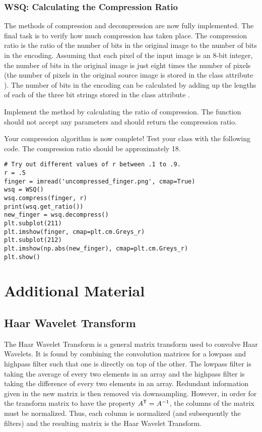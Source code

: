 \subsubsection*{WSQ: Calculating the Compression Ratio}
The methods of compression and decompression are now fully implemented. The final task is to verify how much compression has taken place.
The compression ratio is the ratio of the number of bits in the original image to the number of bits in the encoding.
Assuming that each pixel of the input image is an 8-bit integer, the number of bits in the original image is just eight times the number of pixels
(the number of pixels in the original source image is stored in the class attribute ).
The number of bits in the encoding can be calculated by adding up the lengths of each of the three bit strings stored in the class attribute .
\begin{problem}
Implement the method  by calculating the ratio of compression.
The function should not accept any parameters and should return the compression ratio.

Your compression algorithm is now complete! Test your class with the following code.
The compression ratio should be approximately 18.
\begin{lstlisting}
# Try out different values of r between .1 to .9.
r = .5
finger = imread('uncompressed_finger.png', cmap=True)
wsq = WSQ()
wsq.compress(finger, r)
print(wsq.get_ratio())
new_finger = wsq.decompress()
plt.subplot(211)
plt.imshow(finger, cmap=plt.cm.Greys_r)
plt.subplot(212)
plt.imshow(np.abs(new_finger), cmap=plt.cm.Greys_r)
plt.show()
\end{lstlisting}
\end{problem}
\newpage

\section*{Additional Material} %
\subsection*{Haar Wavelet Transform}
The Haar Wavelet Transform is a general matrix transform used to convolve Haar Wavelets.
It is found by combining the convolution matrices for a lowpass and highpass filter such that one is directly on top of the other.
The lowpass filter is taking the average of every two elements in an array and the highpass filter is taking the difference of every two elements in an array.
Redundant information given in the new matrix is then removed via downsampling.
However, in order for the transform matrix to have the property $A^{\mathsf T} =A^{-1}$, the columns of the matrix must be normalized.
Thus, each column is normalized (and subsequently the filters) and the resulting matrix is the Haar Wavelet Transform.

